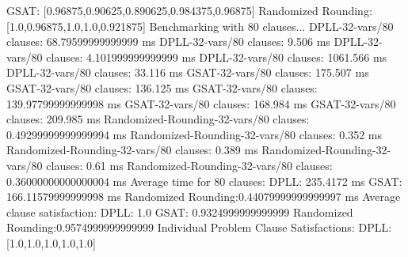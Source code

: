 \documentclass{article}
\begin{document}
  GSAT:               [0.96875,0.90625,0.890625,0.984375,0.96875]\newline
  Randomized Rounding:[1.0,0.96875,1.0,1.0,0.921875]\newline
\newline
\newline
Benchmarking with 80 clauses...\newline
DPLL-32-vars/80 clauses: 68.79599999999999 ms\newline
DPLL-32-vars/80 clauses: 9.506 ms\newline
DPLL-32-vars/80 clauses: 4.101999999999999 ms\newline
DPLL-32-vars/80 clauses: 1061.566 ms\newline
DPLL-32-vars/80 clauses: 33.116 ms\newline
GSAT-32-vars/80 clauses: 175.507 ms\newline
GSAT-32-vars/80 clauses: 136.125 ms\newline
GSAT-32-vars/80 clauses: 139.97799999999998 ms\newline
GSAT-32-vars/80 clauses: 168.984 ms\newline
GSAT-32-vars/80 clauses: 209.985 ms\newline
Randomized-Rounding-32-vars/80 clauses: 0.49299999999999994 ms\newline
Randomized-Rounding-32-vars/80 clauses: 0.352 ms\newline
Randomized-Rounding-32-vars/80 clauses: 0.389 ms\newline
Randomized-Rounding-32-vars/80 clauses: 0.61 ms\newline
Randomized-Rounding-32-vars/80 clauses: 0.36000000000000004 ms\newline
Average time for 80 clauses:\newline
  DPLL:               235.4172 ms\newline
  GSAT:               166.11579999999998 ms\newline
  Randomized Rounding:0.44079999999999997 ms\newline
Average clause satisfaction:\newline
  DPLL:               1.0\newline
  GSAT:               0.9324999999999999\newline
  Randomized Rounding:0.9574999999999999\newline
\newline
Individual Problem Clause Satisfactions:\newline
  DPLL:               [1.0,1.0,1.0,1.0,1.0]\newline
\end{document}
